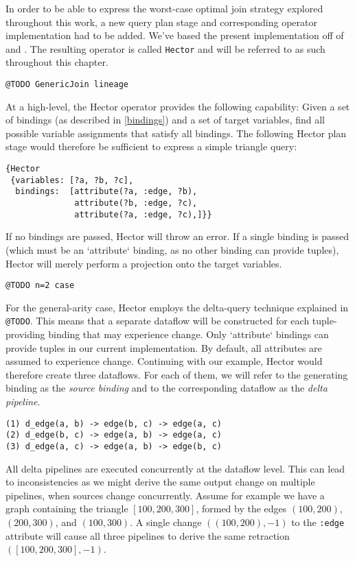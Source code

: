 \documentclass[../index.tex]{subfiles}
\begin{document}
In order to be able to express the worst-case optimal join strategy
explored throughout this work, a new query plan stage and
corresponding operator implementation had to be added. We've based the
present implementation off of \cite{dogsdogsdogs} and
\cite{dataflowjoin}. The resulting operator is called \texttt{Hector}
and will be referred to as such throughout this chapter.

\texttt{@TODO GenericJoin lineage}

At a high-level, the Hector operator provides the following
capability: Given a set of bindings (as described in \ref{bindings})
and a set of target variables, find all possible variable assignments
that satisfy all bindings. The following Hector plan stage would
therefore be sufficient to express a simple triangle query:

\begin{verbatim}
{Hector
 {variables: [?a, ?b, ?c],
  bindings:  [attribute(?a, :edge, ?b),
              attribute(?b, :edge, ?c),
              attribute(?a, :edge, ?c),]}}
\end{verbatim}

If no bindings are passed, Hector will throw an error. If a single
binding is passed (which must be an `attribute` binding, as no other
binding can provide tuples), Hector will merely perform a projection
onto the target variables.

\texttt{@TODO n=2 case}

For the general-arity case, Hector employs the delta-query technique
explained in \texttt{@TODO}. This means that a separate dataflow will
be constructed for each tuple-providing binding that may experience
change. Only `attribute` bindings can provide tuples in our current
implementation. By default, all attributes are assumed to experience
change. Continuing with our example, Hector would therefore create
three dataflows. For each of them, we will refer to the generating
binding as the \emph{source binding} and to the corresponding dataflow
as the \emph{delta pipeline}.

\begin{verbatim}
(1) d_edge(a, b) -> edge(b, c) -> edge(a, c)
(2) d_edge(b, c) -> edge(a, b) -> edge(a, c)
(3) d_edge(a, c) -> edge(a, b) -> edge(b, c)
\end{verbatim}

All delta pipelines are executed concurrently at the dataflow
level. This can lead to inconsistencies as we might derive the same
output change on multiple pipelines, when sources change
concurrently. Assume for example we have a graph containing the
triangle $[100,200,300]$, formed by the edges $(100,200)$,
$(200,300)$, and $(100,300)$. A single change $((100,200),-1)$ to the
\texttt{:edge} attribute will cause all three pipelines to derive the
same retraction $([100,200,300],-1)$.
\end{document}
